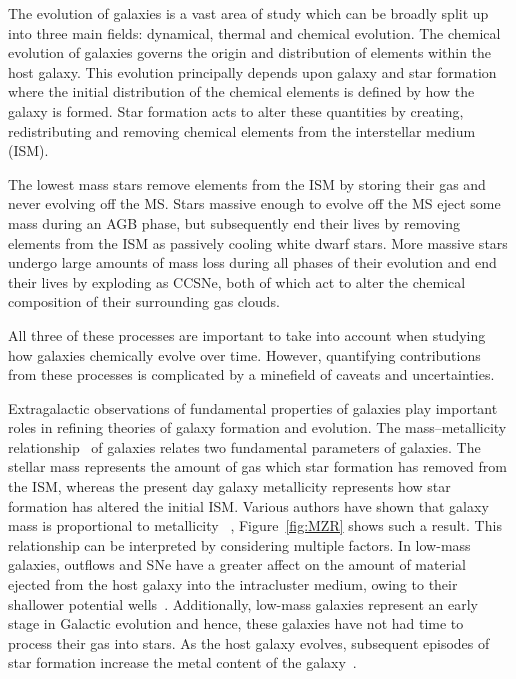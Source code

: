 The evolution of galaxies is a vast area of study which can be broadly split up into three main fields: dynamical, thermal and chemical evolution.
The chemical evolution of galaxies governs the origin and distribution of elements within the host galaxy.
This evolution principally depends upon galaxy and star formation where
the initial distribution of the chemical elements is defined by how the galaxy is formed.
Star formation acts to alter these quantities by creating, redistributing and removing chemical elements from the interstellar medium (ISM).

The lowest mass stars remove elements from the ISM by storing their gas and never evolving off the MS.
Stars massive enough to evolve off the MS eject some mass during an AGB phase, but subsequently end their lives by removing elements from the ISM as passively cooling white dwarf stars.
More massive stars undergo large amounts of mass loss during all phases of their evolution and end their lives by exploding as CCSNe, both of which act to alter the chemical composition of their surrounding gas clouds.

All three of these processes are important to take into account when studying how galaxies chemically evolve over time.
However, quantifying contributions from these processes is complicated by a minefield of caveats and uncertainties.

Extragalactic observations of fundamental properties of galaxies play important roles in refining theories of galaxy formation and evolution.
The mass--metallicity relationship~\citep[MZR;][]{Lequeux79} of galaxies relates two fundamental parameters of galaxies.
The stellar mass represents the amount of gas which star formation has removed from the ISM, whereas the present day galaxy metallicity represents how star formation has altered the initial ISM.
Various authors have shown that galaxy mass is proportional to metallicity
~\citep{Tremonti04, Maiolino08,Kewley08}, Figure~\ref{fig:MZR} shows such a result.
This relationship can be interpreted by considering multiple factors.
In low-mass galaxies, outflows and SNe have a greater affect on the amount of material ejected from the host galaxy into the intracluster medium, owing to their shallower potential wells~\citep[e.g.][]{Tremonti04}.
Additionally, low-mass galaxies represent an early stage in Galactic evolution and hence, these galaxies have not had time to process their gas into stars.
As the host galaxy evolves, subsequent episodes of star formation increase the metal content of the galaxy~\citep[e.g.][and references therein]{Maiolino08}.


